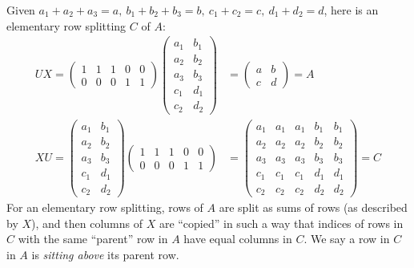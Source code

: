 \documentclass{amsart}
\theoremstyle{definition}
\theoremstyle{remark}
\numberwithin{equation}{section}
\begin{document}
 Given $a_1+a_2+a_3=a,\  b_1+b_2+b_3=b,\ c_1+c_2=c,\ d_1+d_2=d$,  
here is an elementary row splitting $C$ of $A$: 
\begin{align*} 
UX = 
\begin{pmatrix} 
1 & 1 & 1& 0 & 0 \\
0 & 0 & 0 & 1 &1
\end{pmatrix} 
\begin{pmatrix} 
a_1 & b_1 \\
a_2 & b_2 \\
a_3 & b_3 \\
c_1 & d_1 \\
c_2 & d_2
\end{pmatrix} 
&=
\begin{pmatrix} a &b \\ c & d 
\end{pmatrix} 
= A \\ 
XU = 
\begin{pmatrix} 
a_1 & b_1 \\
a_2 & b_2 \\
a_3 & b_3 \\
c_1 & d_1 \\
c_2 & d_2
\end{pmatrix} 
\begin{pmatrix} 
1 & 1 & 1& 0 & 0 \\
0 & 0 & 0 & 1 &1
\end{pmatrix} 
& =  
\begin{pmatrix} 
a_1 &a_1 &a_1 & b_1& b_1 \\
a_2 &a_2 &a_2 & b_2& b_2 \\
a_3 &a_3 &a_3 & b_3& b_3 \\
c_1 &c_1 &c_1 & d_1& d_1 \\
c_2 &c_2 &c_2 & d_2& d_2
\end{pmatrix} = C 
\end{align*}
For an elementary row splitting, rows of $A$ are split as sums 
of rows (as described by $X$), and then columns of $X$ are ``copied''
in such a way that indices of rows in $C$ with the same ``parent'' row in $A$ 
have equal columns in $C$. We say a row in $C$ 
in $A$ is {\it sitting above} its parent row.
\end{document}
